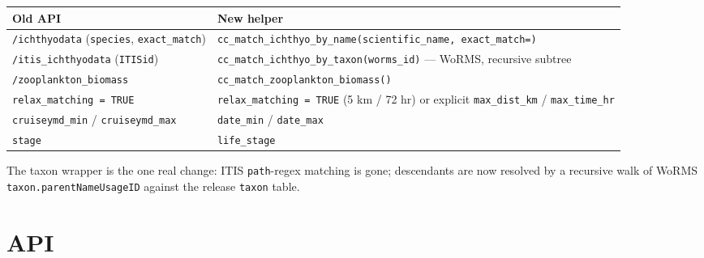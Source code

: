 \documentclass[
  letterpaper,
  DIV=11,
  numbers=noendperiod]{scrreprt}
\begin{document}
\begin{longtable}[]{@{}
  >{\raggedright\arraybackslash}p{}
  >{\raggedright\arraybackslash}p{}@{}}
\toprule\noalign{}
\begin{minipage}[b]{\linewidth}\raggedright
Old API
\end{minipage} & \begin{minipage}[b]{\linewidth}\raggedright
New helper
\end{minipage} \\
\midrule\noalign{}
\endhead
\bottomrule\noalign{}
\endlastfoot
\texttt{/ichthyodata} (\texttt{species}, \texttt{exact\_match}) &
\texttt{cc\_match\_ichthyo\_by\_name(scientific\_name,\ exact\_match=)} \\
\texttt{/itis\_ichthyodata} (\texttt{ITISid}) &
\texttt{cc\_match\_ichthyo\_by\_taxon(worms\_id)} --- WoRMS, recursive
subtree \\
\texttt{/zooplankton\_biomass} &
\texttt{cc\_match\_zooplankton\_biomass()} \\
\texttt{relax\_matching\ =\ TRUE} & \texttt{relax\_matching\ =\ TRUE} (5
km / 72 hr) or explicit \texttt{max\_dist\_km} /
\texttt{max\_time\_hr} \\
\texttt{cruiseymd\_min} / \texttt{cruiseymd\_max} & \texttt{date\_min} /
\texttt{date\_max} \\
\texttt{stage} & \texttt{life\_stage} \\
\end{longtable}

The taxon wrapper is the one real change: ITIS \texttt{path}-regex
matching is gone; descendants are now resolved by a recursive walk of
WoRMS \texttt{taxon.parentNameUsageID} against the release
\texttt{taxon} table.


\chapter{API}\label{api}
\end{document}
